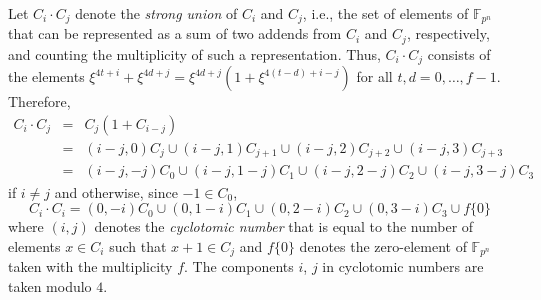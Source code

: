 \documentclass[11pt, reqno]{amsart}
\newcommand{\Ff}{{\mathbb F}}
\begin{document}
Let $C_i\cdot C_j$ denote the {\em strong union} of $C_i$ and $C_j$,
i.e., the set of elements of $\Ff_{p^n}$ that can be represented as
a sum of two addends from $C_i$ and $C_j$, respectively, and
counting the multiplicity of such a representation. Thus, $C_i\cdot
C_j$ consists of the elements
$\xi^{4t+i}+\xi^{4d+j}=\xi^{4d+j}(1+\xi^{4(t-d)+i-j})$ for all
$t,d=0,\dots,f-1$. Therefore,
\begin{eqnarray}
 \label{eq:15}
\nonumber C_i\cdot C_j&=&C_j(1+C_{i-j})\\
\nonumber&=&(i-j,0)C_j\cup(i-j,1)C_{j+1}\cup(i-j,2)C_{j+2}\cup(i-j,3)C_{j+3}\\
&=&(i-j,-j)C_0\cup(i-j,1-j)C_1\cup(i-j,2-j)C_2\cup(i-j,3-j)C_3\enspace\enspace\enspace
\end{eqnarray}
if $i\neq j$ and otherwise, since $-1\in C_0$,
\begin{equation}
 \label{eq:16}
C_i\cdot C_i=(0,-i)C_0\cup(0,1-i)C_1\cup(0,2-i)C_2\cup(0,3-i)C_3\cup
f\{0\}
\end{equation}
where $(i,j)$ denotes the {\em cyclotomic number} that is equal to
the number of elements $x\in C_i$ such that $x+1\in C_j$ and
$f\{0\}$ denotes the zero-element of $\Ff_{p^n}$ taken with the
multiplicity $f$. The components $i$, $j$ in cyclotomic numbers are
taken modulo $4$.
\end{document}

